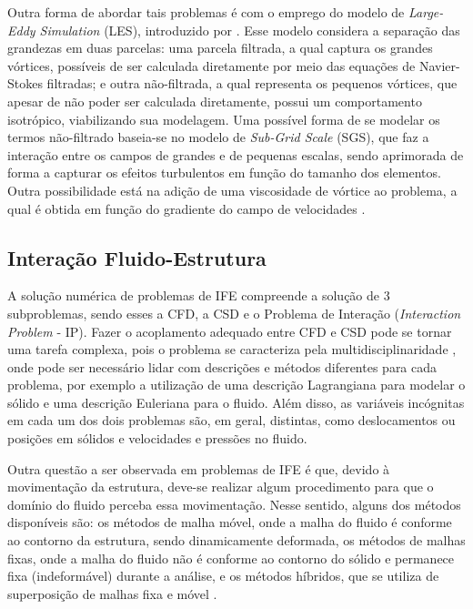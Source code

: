 Outra forma de abordar tais problemas é com o emprego do modelo de \textit{Large-Eddy Simulation} (LES), introduzido por . Esse modelo considera a separação das grandezas em duas parcelas: uma parcela filtrada, a qual captura os grandes vórtices, possíveis de ser calculada diretamente por meio das equações de Navier-Stokes filtradas; e outra não-filtrada, a qual representa os pequenos vórtices, que apesar de não poder ser calculada diretamente, possui um comportamento isotrópico, viabilizando sua modelagem. Uma possível forma de se modelar os termos não-filtrado baseia-se no modelo de \textit{Sub-Grid Scale} (SGS), que faz a interação entre os campos de grandes e de pequenas escalas, sendo aprimorada de forma a capturar os efeitos turbulentos em função do tamanho dos elementos. Outra possibilidade está na adição de uma viscosidade de vórtice ao problema, a qual é obtida em função do gradiente do campo de velocidades \cite{ghosal1995basic,hughes2000large,moeng2015large}.%

\subsection{Interação Fluido-Estrutura} \label{IFE}

A solução numérica de problemas de IFE compreende a solução de 3 subproblemas, sendo esses a CFD, a CSD e o Problema de Interação (\textit{Interaction Problem} - IP). Fazer o acoplamento adequado entre CFD e CSD pode se tornar uma tarefa complexa, pois o problema se caracteriza pela multidisciplinaridade \cite{hou2012numerical}, onde pode ser necessário lidar com descrições e métodos diferentes para cada problema, por exemplo a utilização de uma descrição Lagrangiana para modelar o sólido e uma descrição Euleriana para o fluido. Além disso, as variáveis incógnitas em cada um dos dois problemas são, em geral, distintas, como deslocamentos ou posições em sólidos e velocidades e pressões no fluido.

Outra questão a ser observada em problemas de IFE é que, devido à movimentação da estrutura, deve-se realizar algum procedimento para que o domínio do fluido perceba essa movimentação. Nesse sentido, alguns dos métodos disponíveis são: os métodos de malha móvel, onde a malha do fluido é conforme ao contorno da estrutura, sendo dinamicamente deformada, os métodos de malhas fixas, onde a malha do fluido não é conforme ao contorno do sólido e permanece fixa (indeformável) durante a análise, e os métodos híbridos, que se utiliza de superposição de malhas fixa e móvel \cite{fernandes2020tecnica}.

